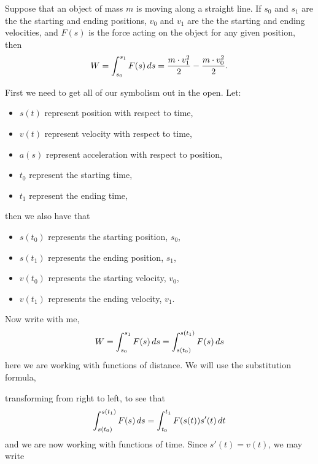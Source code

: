 \documentclass{ximera}
\begin{document}
\begin{theorem}
  Suppose that an object of mass $m$ is moving along a straight
  line. If $s_0$ and $s_1$ are the the starting and ending positions,
  $v_0$ and $v_1$ are the the starting and ending velocities, and
  $F(s)$ is the force acting on the object for any given position,
  then
  \[
  W = \int_{s_0}^{s_1} F(s) \,d s = \frac{m\cdot v_1^2}{2} - \frac{m\cdot v_0^2}{2}.
  \]
  \begin{explanation}
    First we need to get all of our symbolism out in the open. Let:
    \begin{itemize}
    \item $s(t)$ represent position with respect to time,
    \item $v(t)$ represent velocity with respect to time,
    \item $a(s)$ represent acceleration with respect to position,
    \item $t_0$ represent the starting time,
    \item $t_1$ represent the ending time,
    \end{itemize}
    then we also have that
    \begin{itemize}
    \item $s(t_0)$ represents the starting position, $s_0$,
    \item $s(t_1)$ represents the ending position, $s_1$,
    \item $v(t_0)$ represents the starting velocity, $v_0$,
    \item $v(t_1)$ represents the ending velocity, $v_1$.
    \end{itemize}
    Now write with me,
    \[
    W = \int_{s_0}^{s_1} F(s) \,d s = \int_{s(t_0)}^{s(t_1)} F(s) \,d s
    \]
    here we are working with functions of distance. We will use the
    substitution formula,
    \begin{image}
  \end{image} 
    transforming from right to left, to see that
    \[
    \int_{s(t_0)}^{s(t_1)} F(s) \,d s = \int_{t_0}^{t_1} F(s(t)) s'(t) \,d t
    \]
    and we are now working with functions of time. Since $s'(t) =
    v(t)$, we may write

\end{explanation}
\end{theorem}
\end{document}
